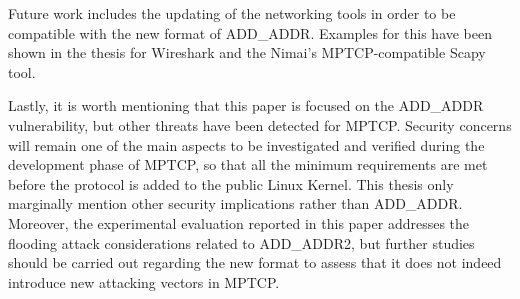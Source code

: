 Future work includes the updating of the networking tools in order to be compatible with the new format of ADD\_ADDR. Examples for this have been shown in the thesis for Wireshark and the Nimai's MPTCP-compatible Scapy tool.

Lastly, it is worth mentioning that this paper is focused on the ADD\_ADDR vulnerability, but other threats have been detected for MPTCP. Security concerns will remain one of the main aspects to be investigated and verified during the development phase of MPTCP, so that all the minimum requirements are met before the protocol is added to the public Linux Kernel. This thesis only marginally mention other security implications rather than ADD\_ADDR. Moreover, the experimental evaluation reported in this paper addresses the flooding attack considerations related to ADD\_ADDR2, but further studies should be carried out regarding the new format to assess that it does not indeed introduce new attacking vectors in MPTCP.